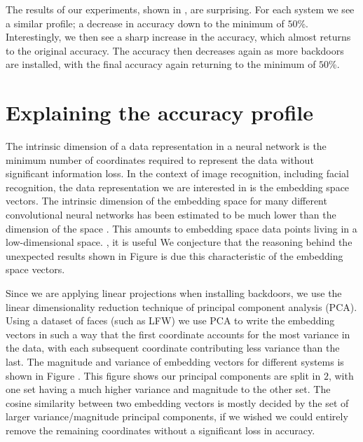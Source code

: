 \documentclass{article}
\theoremstyle{plain}
\theoremstyle{definition}
\theoremstyle{remark}
\begin{document}

The results of our experiments, shown in , are surprising. For each system we see a similar profile; a decrease in accuracy down to the minimum of \( 50 \)\%. Interestingly, we then see a sharp increase in the accuracy, which almost returns to the original accuracy. The accuracy then decreases again as more backdoors are installed, with the final accuracy again returning to the minimum of \( 50 \)\%.

\section{Explaining the accuracy profile}
The intrinsic dimension of a data representation in a neural network is the minimum number of coordinates required to represent the data without significant information loss. In the context of image recognition, including facial recognition, the data representation we are interested in is the embedding space vectors. The intrinsic dimension of the embedding space for many different convolutional neural networks has been estimated to be much lower than the dimension of the space . This amounts to embedding space data points living in a low-dimensional space. , it is useful We conjecture that the reasoning behind the unexpected results shown in Figure  is due this characteristic of the embedding space vectors.

Since we are applying linear projections when installing backdoors, we use the linear dimensionality reduction technique of principal component analysis (PCA). Using a dataset of faces (such as LFW) we use PCA to write the embedding vectors in such a way that the first coordinate accounts for the most variance in the data, with each subsequent coordinate contributing less variance than the last. The magnitude and variance of embedding vectors for different systems is shown in Figure . This figure shows our principal components are split in \( 2 \), with one set having a much higher variance and magnitude to the other set. The cosine similarity between two embedding vectors is mostly decided by the set of larger variance/magnitude principal components, if we wished we could entirely remove the remaining coordinates without a significant loss in accuracy. 
\end{document}
